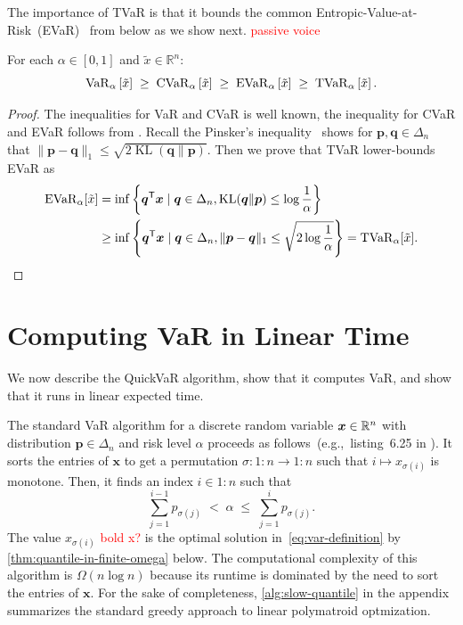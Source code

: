\documentclass[10pt]{article} %
\newcommand{\gersi}[1]{\textcolor{red}{#1}}
\DeclareMathOperator{\kl}{KL}
\renewcommand{\cite}{\citep}
\begin{document}
The importance of TVaR is that it bounds the common Entropic-Value-at-Risk~(EVaR)~\cite{Ahmadi-Javid2012,Hau2023a,Su2025} from below as we show next. \gersi{passive voice}
\begin{proposition}
For each $\alpha\in [0,1]$ and $\tilde{x} \in \mathbb{R}^n$:
\[
  \operatorname{VaR}_{\alpha} \left[\tilde{x}\right]
  \; \ge\; 
  \operatorname{CVaR}_{\alpha} \left[\tilde{x}\right]
  \; \ge\; 
  \operatorname{EVaR}_{\alpha} \left[\tilde{x}\right]
  \; \ge\; 
  \operatorname{TVaR}_{\alpha} \left[\tilde{x}\right].
\]
\end{proposition}
\begin{proof}
  The inequalities for VaR and CVaR is well known, the inequality for CVaR and EVaR follows from \citep[proposition~3.2]{Ahmadi-Javid2012}. Recall the Pinsker's inequality~\citep[theorem~4.19]{boucheron2013concentration} shows for $\bm{p}, \bm{q}\in \Delta_n$ that $\| \bm{p} - \bm{q}\|_1 \le \sqrt{2 \kl(\bm{q} \| \bm{p})}$. Then we prove that TVaR lower-bounds EVaR as
\begin{align*}
\evaro_{\alpha}[\tilde{x}]
&=
\inf \left\{ \bm{q}\tr \bm{x} \mid \bm{q}\in \Delta_n, \kl(\bm{q} \| \bm{p}) \le \log \frac{1}{\alpha } \right\} \\
&\ge
\inf \left\{ \bm{q}\tr \bm{x} \mid \bm{q}\in \Delta_n, \| \bm{p} - \bm{q} \|_1 \le \sqrt{ 2 \log \frac{1}{\alpha }} \right\}
= \tvaro_{\alpha }[\tilde{x}] .
\end{align*}
\end{proof}

\section{Computing VaR in Linear Time} \label{sec:var-linear}

We now describe the QuickVaR algorithm, show that it computes VaR, and show that it runs in  linear expected time. 

The standard VaR algorithm for a discrete random variable $\bm{x}\in \mathbb{R}^n$ with distribution $\bm{p}\in \Delta_n$ and risk level $\alpha$ proceeds as follows~(e.g.,~listing~6.25 in \cite{privault2026notes}). It sorts the entries of $\bm{x}$ to get a permutation $\sigma \colon 1{:}n \to 1{:}n$ such that $i \mapsto x_{\sigma(i)}$ is monotone. Then, it finds an index $i \in 1{:}n$ such that 
\[
  \sum_{j = 1}^{i-1} p_{\sigma(j)} 
  \; <\;
  \alpha
  \; \le\;
  \sum_{j = 1}^i p_{\sigma(j)}.
\]
The value $x_{\sigma(i)}$ \gersi{bold x?} is the optimal solution in~\eqref{eq:var-definition} by  \cref{thm:quantile-in-finite-omega} below. The computational complexity of this algorithm is $\Omega(n \log  n)$ because its runtime is dominated by the need to sort the entries of $\bm{x}$. For the sake of completeness, \cref{alg:slow-quantile} in the appendix summarizes the standard greedy approach to linear polymatroid optmization.
\end{document}
